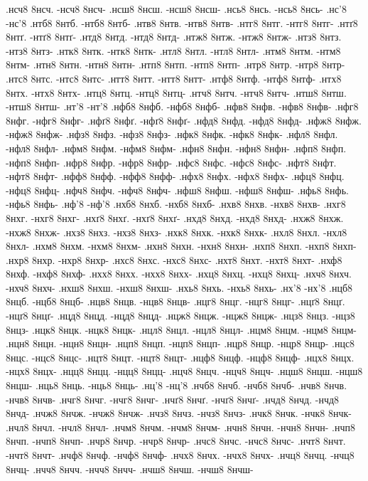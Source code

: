 {.нсч8 8нсч. -нсч8 8нсч-
.нсш8 8нсш. -нсш8 8нсш-
.нсь8 8нсь. -нсь8 8нсь-
.нс'8 -нс'8
.нтб8 8нтб. -нтб8 8нтб-
.нтв8 8нтв. -нтв8 8нтв-
.нтг8 8нтг. -нтг8 8нтг-
.нтґ8 8нтґ. -нтґ8 8нтґ-
.нтд8 8нтд. -нтд8 8нтд-
.нтж8 8нтж. -нтж8 8нтж-
.нтз8 8нтз. -нтз8 8нтз-
.нтк8 8нтк. -нтк8 8нтк-
.нтл8 8нтл. -нтл8 8нтл-
.нтм8 8нтм. -нтм8 8нтм-
.нтн8 8нтн. -нтн8 8нтн-
.нтп8 8нтп. -нтп8 8нтп-
.нтр8 8нтр. -нтр8 8нтр-
.нтс8 8нтс. -нтс8 8нтс-
.нтт8 8нтт. -нтт8 8нтт-
.нтф8 8нтф. -нтф8 8нтф-
.нтх8 8нтх. -нтх8 8нтх-
.нтц8 8нтц. -нтц8 8нтц-
.нтч8 8нтч. -нтч8 8нтч-
.нтш8 8нтш. -нтш8 8нтш-
.нт'8 -нт'8
.нфб8 8нфб. -нфб8 8нфб-
.нфв8 8нфв. -нфв8 8нфв-
.нфг8 8нфг. -нфг8 8нфг-
.нфґ8 8нфґ. -нфґ8 8нфґ-
.нфд8 8нфд. -нфд8 8нфд-
.нфж8 8нфж. -нфж8 8нфж-
.нфз8 8нфз. -нфз8 8нфз-
.нфк8 8нфк. -нфк8 8нфк-
.нфл8 8нфл. -нфл8 8нфл-
.нфм8 8нфм. -нфм8 8нфм-
.нфн8 8нфн. -нфн8 8нфн-
.нфп8 8нфп. -нфп8 8нфп-
.нфр8 8нфр. -нфр8 8нфр-
.нфс8 8нфс. -нфс8 8нфс-
.нфт8 8нфт. -нфт8 8нфт-
.нфф8 8нфф. -нфф8 8нфф-
.нфх8 8нфх. -нфх8 8нфх-
.нфц8 8нфц. -нфц8 8нфц-
.нфч8 8нфч. -нфч8 8нфч-
.нфш8 8нфш. -нфш8 8нфш-
.нфь8 8нфь. -нфь8 8нфь-
.нф'8 -нф'8
.нхб8 8нхб. -нхб8 8нхб-
.нхв8 8нхв. -нхв8 8нхв-
.нхг8 8нхг. -нхг8 8нхг-
.нхґ8 8нхґ. -нхґ8 8нхґ-
.нхд8 8нхд. -нхд8 8нхд-
.нхж8 8нхж. -нхж8 8нхж-
.нхз8 8нхз. -нхз8 8нхз-
.нхк8 8нхк. -нхк8 8нхк-
.нхл8 8нхл. -нхл8 8нхл-
.нхм8 8нхм. -нхм8 8нхм-
.нхн8 8нхн. -нхн8 8нхн-
.нхп8 8нхп. -нхп8 8нхп-
.нхр8 8нхр. -нхр8 8нхр-
.нхс8 8нхс. -нхс8 8нхс-
.нхт8 8нхт. -нхт8 8нхт-
.нхф8 8нхф. -нхф8 8нхф-
.нхх8 8нхх. -нхх8 8нхх-
.нхц8 8нхц. -нхц8 8нхц-
.нхч8 8нхч. -нхч8 8нхч-
.нхш8 8нхш. -нхш8 8нхш-
.нхь8 8нхь. -нхь8 8нхь-
.нх'8 -нх'8
.нцб8 8нцб. -нцб8 8нцб-
.нцв8 8нцв. -нцв8 8нцв-
.нцг8 8нцг. -нцг8 8нцг-
.нцґ8 8нцґ. -нцґ8 8нцґ-
.нцд8 8нцд. -нцд8 8нцд-
.нцж8 8нцж. -нцж8 8нцж-
.нцз8 8нцз. -нцз8 8нцз-
.нцк8 8нцк. -нцк8 8нцк-
.нцл8 8нцл. -нцл8 8нцл-
.нцм8 8нцм. -нцм8 8нцм-
.нцн8 8нцн. -нцн8 8нцн-
.нцп8 8нцп. -нцп8 8нцп-
.нцр8 8нцр. -нцр8 8нцр-
.нцс8 8нцс. -нцс8 8нцс-
.нцт8 8нцт. -нцт8 8нцт-
.нцф8 8нцф. -нцф8 8нцф-
.нцх8 8нцх. -нцх8 8нцх-
.нцц8 8нцц. -нцц8 8нцц-
.нцч8 8нцч. -нцч8 8нцч-
.нцш8 8нцш. -нцш8 8нцш-
.нць8 8нць. -нць8 8нць-
.нц'8 -нц'8
.нчб8 8нчб. -нчб8 8нчб-
.нчв8 8нчв. -нчв8 8нчв-
.нчг8 8нчг. -нчг8 8нчг-
.нчґ8 8нчґ. -нчґ8 8нчґ-
.нчд8 8нчд. -нчд8 8нчд-
.нчж8 8нчж. -нчж8 8нчж-
.нчз8 8нчз. -нчз8 8нчз-
.нчк8 8нчк. -нчк8 8нчк-
.нчл8 8нчл. -нчл8 8нчл-
.нчм8 8нчм. -нчм8 8нчм-
.нчн8 8нчн. -нчн8 8нчн-
.нчп8 8нчп. -нчп8 8нчп-
.нчр8 8нчр. -нчр8 8нчр-
.нчс8 8нчс. -нчс8 8нчс-
.нчт8 8нчт. -нчт8 8нчт-
.нчф8 8нчф. -нчф8 8нчф-
.нчх8 8нчх. -нчх8 8нчх-
.нчц8 8нчц. -нчц8 8нчц-
.нчч8 8нчч. -нчч8 8нчч-
.нчш8 8нчш. -нчш8 8нчш-
}
